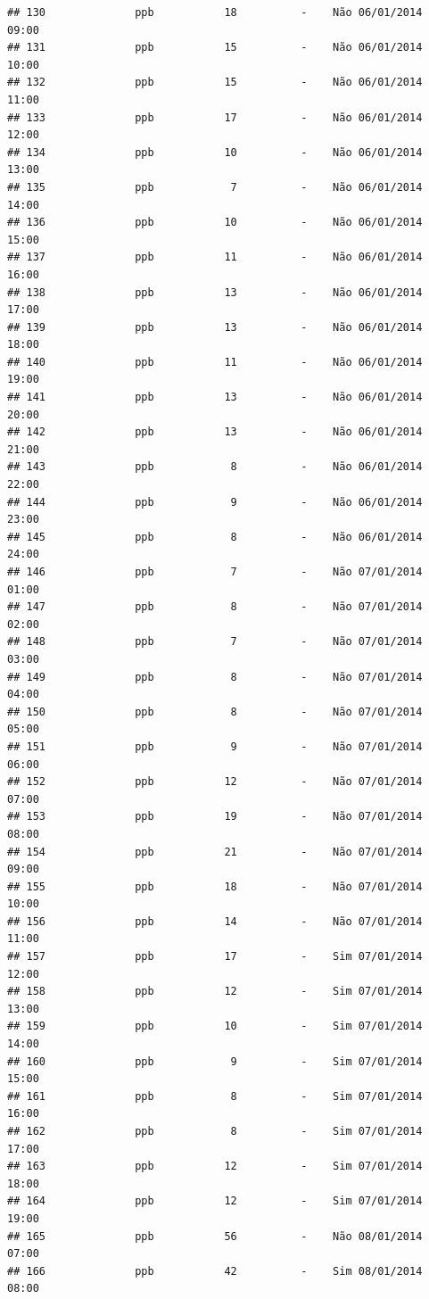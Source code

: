 \documentclass[]{book}
\begin{document}
\begin{verbatim}
## 130              ppb           18          -    Não 06/01/2014 09:00
## 131              ppb           15          -    Não 06/01/2014 10:00
## 132              ppb           15          -    Não 06/01/2014 11:00
## 133              ppb           17          -    Não 06/01/2014 12:00
## 134              ppb           10          -    Não 06/01/2014 13:00
## 135              ppb            7          -    Não 06/01/2014 14:00
## 136              ppb           10          -    Não 06/01/2014 15:00
## 137              ppb           11          -    Não 06/01/2014 16:00
## 138              ppb           13          -    Não 06/01/2014 17:00
## 139              ppb           13          -    Não 06/01/2014 18:00
## 140              ppb           11          -    Não 06/01/2014 19:00
## 141              ppb           13          -    Não 06/01/2014 20:00
## 142              ppb           13          -    Não 06/01/2014 21:00
## 143              ppb            8          -    Não 06/01/2014 22:00
## 144              ppb            9          -    Não 06/01/2014 23:00
## 145              ppb            8          -    Não 06/01/2014 24:00
## 146              ppb            7          -    Não 07/01/2014 01:00
## 147              ppb            8          -    Não 07/01/2014 02:00
## 148              ppb            7          -    Não 07/01/2014 03:00
## 149              ppb            8          -    Não 07/01/2014 04:00
## 150              ppb            8          -    Não 07/01/2014 05:00
## 151              ppb            9          -    Não 07/01/2014 06:00
## 152              ppb           12          -    Não 07/01/2014 07:00
## 153              ppb           19          -    Não 07/01/2014 08:00
## 154              ppb           21          -    Não 07/01/2014 09:00
## 155              ppb           18          -    Não 07/01/2014 10:00
## 156              ppb           14          -    Não 07/01/2014 11:00
## 157              ppb           17          -    Sim 07/01/2014 12:00
## 158              ppb           12          -    Sim 07/01/2014 13:00
## 159              ppb           10          -    Sim 07/01/2014 14:00
## 160              ppb            9          -    Sim 07/01/2014 15:00
## 161              ppb            8          -    Sim 07/01/2014 16:00
## 162              ppb            8          -    Sim 07/01/2014 17:00
## 163              ppb           12          -    Sim 07/01/2014 18:00
## 164              ppb           12          -    Sim 07/01/2014 19:00
## 165              ppb           56          -    Não 08/01/2014 07:00
## 166              ppb           42          -    Sim 08/01/2014 08:00

\end{verbatim}
\end{document}
